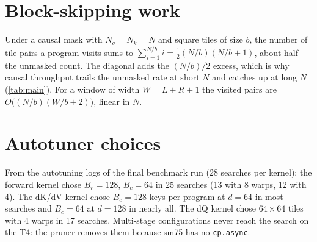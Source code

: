 \documentclass[10pt,twocolumn,letterpaper]{article}
\begin{document}
\section{Block-skipping work}
\label{sec:skip}

Under a causal mask with $N_q = N_k = N$ and square tiles of size $b$, the
number of tile pairs a program visits sums to
$\sum_{i=1}^{N/b} i = \tfrac{1}{2}(N/b)(N/b + 1)$, about half the unmasked
count. The diagonal adds the $(N/b)/2$ excess, which is why causal
throughput trails the unmasked rate at short $N$ and catches up at long $N$
(\cref{tab:main}). For a window of width $W = L + R + 1$ the visited pairs are
$O\bigl((N/b)(W/b + 2)\bigr)$, linear in $N$.

\section{Autotuner choices}
\label{sec:tune}

From the autotuning logs of the final benchmark run (28 searches per
kernel): the forward kernel chose $B_r{=}128$, $B_c{=}64$ in 25 searches (13
with 8 warps, 12 with 4). The dK/dV kernel chose $B_c{=}128$ keys per program
at $d = 64$ in most searches and $B_c{=}64$ at $d = 128$ in nearly all. The dQ
kernel chose $64 \times 64$ tiles with 4 warps in 17 searches. Multi-stage
configurations never reach the search on the T4: the pruner removes them
because sm75 has no
\texttt{cp.async}.
\end{document}
